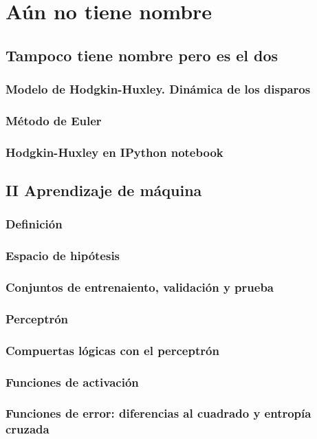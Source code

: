 \documentclass[12pt,openany]{book}
\begin{document}
\part{Aún no tiene nombre} %
\chapter{Tampoco tiene nombre pero es el dos} %
\section{Modelo de Hodgkin-Huxley. Dinámica de los disparos}
\section{Método de Euler}
\section{Hodgkin-Huxley en IPython notebook}

\chapter{II Aprendizaje de máquina} %
\section{Definición}
\section{Espacio de hipótesis}
\section{Conjuntos de entrenaiento, validación y prueba}
\section{Perceptrón}
\section{Compuertas lógicas con el perceptrón}
\section{Funciones de activación}
\section{Funciones de error: diferencias al cuadrado y entropía cruzada}
\end{document}
